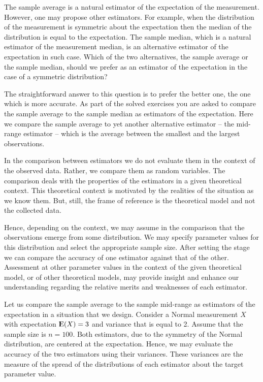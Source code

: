 \documentclass[]{krantz}
\newcommand{\Expec}{{\rm I\kern-.3em E}}
\theoremstyle{definition}
\theoremstyle{definition}
\theoremstyle{definition}
\theoremstyle{remark}
\begin{document}
The sample average is a natural estimator of the expectation of the
measurement. However, one may propose other estimators. For example,
when the distribution of the measurement is symmetric about the
expectation then the median of the distribution is equal to the
expectation. The sample median, which is a natural estimator of the
measurement median, is an alternative estimator of the expectation in
such case. Which of the two alternatives, the sample average or the
sample median, should we prefer as an estimator of the expectation in
the case of a symmetric distribution?

The straightforward answer to this question is to prefer the better one,
the one which is more accurate. As part of the solved exercises you are
asked to compare the sample average to the sample median as estimators
of the expectation. Here we compare the sample average to yet another
alternative estimator -- the mid-range estimator -- which is the average
between the smallest and the largest observations.

In the comparison between estimators we do not evaluate them in the
context of the observed data. Rather, we compare them as random
variables. The comparison deals with the properties of the estimators in
a given theoretical context. This theoretical context is motivated by
the realities of the situation as we know them. But, still, the frame of
reference is the theoretical model and not the collected data.

Hence, depending on the context, we may assume in the comparison that
the observations emerge from some distribution. We may specify parameter
values for this distribution and select the appropriate sample size.
After setting the stage we can compare the accuracy of one estimator
against that of the other. Assessment at other parameter values in the
context of the given theoretical model, or of other theoretical models,
may provide insight and enhance our understanding regarding the relative
merits and weaknesses of each estimator.

Let us compare the sample average to the sample mid-range as estimators
of the expectation in a situation that we design. Consider a Normal
measurement \(X\) with expectation \(\Expec(X) = 3\) and variance that is
equal to 2. Assume that the sample size is \(n = 100\). Both estimators,
due to the symmetry of the Normal distribution, are centered at the
expectation. Hence, we may evaluate the accuracy of the two estimators
using their variances. These variances are the measure of the spread of
the distributions of each estimator about the target parameter value.
\end{document}
